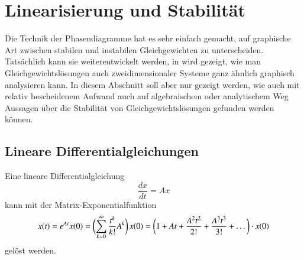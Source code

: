 %
%
%
\section{Linearisierung und Stabilität\label{section:linearisierung}}
Die Technik der Phasendiagramme hat es sehr einfach gemacht, auf graphische
Art zwischen stabilen und instabilen Gleichgewichten zu unterscheiden.
Tatsächlich kann sie weiterentwickelt werden, in \cite{skript:mathsem-dgl}
wird gezeigt, wie man Gleichgewichtslösungen auch zweidimensionaler
Systeme ganz ähnlich graphisch analysieren kann.
In diesem Abschnitt soll aber nur gezeigt werden, wie auch mit relativ
bescheidenem Aufwand auch auf algebraischem oder analytischem Weg
Aussagen über die Stabilität von Gleichgewichtslösungen gefunden werden
können.

\subsection{Lineare Differentialgleichungen}
Eine lineare Differentialgleichung
%
\begin{equation}
\frac{dx}{dt}
=
Ax
\label{skript:lin:dgl}
\end{equation}
kann mit der Matrix-Exponentialfunktion
\begin{equation}
x(t) = e^{At} x(0)
=
\biggl(
\sum_{k=0}^\infty \frac{t^k}{k!}A^k
\biggr)\, x(0)
=
\biggl(
1+ At + \frac{A^2t^2}{2!} +\frac{A^3t^3}{3!}+\dots
\biggl)\mathstrut\cdot x(0)
\label{skript:lin:potenzreihe}
\end{equation}
gelöst werden.

